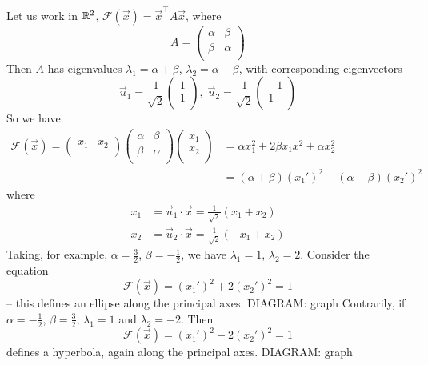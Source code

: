 \documentclass{../template/note}
\begin{document}
    \begin{example}
        Let us work in \(\mathbb R^2\), \(\mathcal F(\vec x) = \vec x^\intercal A \vec x\), where
        \[
            A = \begin{pmatrix}
                \alpha & \beta \\
                \beta & \alpha \\
            \end{pmatrix}
        \]
        Then \(A\) has eigenvalues \(\lambda_1 = \alpha + \beta\), \(\lambda_2 = \alpha - \beta\), with corresponding eigenvectors
        \[
            \vec u_1 = \frac{1}{\sqrt 2} \begin{pmatrix}
                1 \\
                1 \\
            \end{pmatrix}, \; \vec u_2 = \frac{1}{\sqrt 2} \begin{pmatrix}
                -1 \\
                1 \\
            \end{pmatrix}
        \]
        So we have
        \begin{align*}
            \mathcal F(\vec x) = \begin{pmatrix}
             x_1 & x_2 \\
            \end{pmatrix} \begin{pmatrix}
             \alpha & \beta \\
             \beta & \alpha \\
            \end{pmatrix} \begin{pmatrix}
             x_1 \\
             x_2 \\
            \end{pmatrix} &= \alpha x_1^2 + 2\beta x_1x^2 + \alpha x_2^2 \\
            &= (\alpha + \beta)(x_1')^2 + (\alpha-\beta)(x_2')^2
        \end{align*}
        where
        \begin{align*}
            x_1 &= \vec u_1 \cdot \vec x = \frac{1}{\sqrt 2}(x_1 + x_2) \\
            x_2 &= \vec u_2 \cdot \vec x = \frac{1}{\sqrt 2}(-x_1 + x_2)
        \end{align*}
        Taking, for example, \(\alpha = \frac{3}{2}\), \(\beta = -\frac{1}{2}\), we have \(\lambda_1 = 1\), \(\lambda_2 = 2\). Consider the equation
        \[
            \mathcal F(\vec x) = (x_1')^2 + 2(x_2')^2 = 1
        \]
        -- this defines an ellipse along the principal axes.
        DIAGRAM: graph
        Contrarily, if \(\alpha = -\frac{1}{2}\), \(\beta = \frac{3}{2}\), \(\lambda_1 = 1\) and \(\lambda_2 = -2\). Then
        \[
            \mathcal F(\vec x) = (x_1')^2 - 2(x_2')^2 = 1
        \]
        defines a hyperbola, again along the principal axes.
        DIAGRAM: graph
    \end{example}
    
\end{document}

